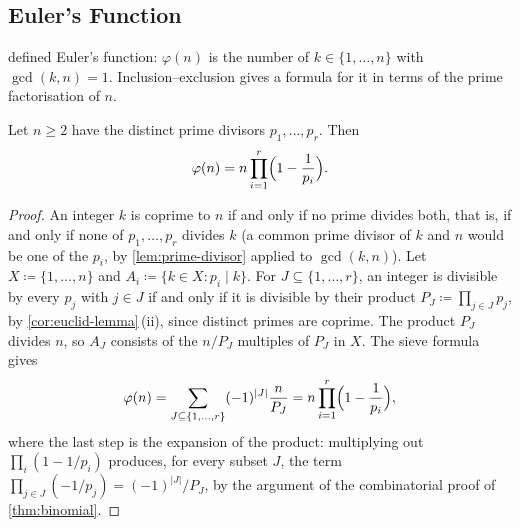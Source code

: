 \begin{table}
\end{table}

\subsection{Euler's Function}

 defined Euler's function: $\varphi(n)$ is the number of $k\in\{1,\ldots,n\}$ with $\gcd(k,n)=1$. Inclusion--exclusion gives a formula for it in terms of the prime factorisation of $n$.

\begin{theorem}
\label{thm:phi-formula}
Let $n\ge2$ have the distinct prime divisors $p_1,\ldots,p_r$. Then
\[
\varphi(n)=n\prod_{i=1}^{r}\Bigl(1-\frac1{p_i}\Bigr).
\]
\end{theorem}

\begin{proof}
An integer $k$ is coprime to $n$ if and only if no prime divides both, that is, if and only if none of $p_1,\ldots,p_r$ divides $k$ (a common prime divisor of $k$ and $n$ would be one of the $p_i$, by \cref{lem:prime-divisor} applied to $\gcd(k,n)$). Let $X\coloneqq\{1,\ldots,n\}$ and $A_i\coloneqq\{k\in X: p_i\mid k\}$. For $J\subseteq\{1,\ldots,r\}$, an integer is divisible by every $p_j$ with $j\in J$ if and only if it is divisible by their product $P_J\coloneqq\prod_{j\in J}p_j$, by \cref{cor:euclid-lemma}\,(ii), since distinct primes are coprime. The product $P_J$ divides $n$, so $A_J$ consists of the $n/P_J$ multiples of $P_J$ in $X$. The sieve formula gives
\[
\varphi(n)=\sum_{J\subseteq\{1,\ldots,r\}}(-1)^{|J|}\frac{n}{P_J}=n\prod_{i=1}^{r}\Bigl(1-\frac1{p_i}\Bigr),
\]
where the last step is the expansion of the product: multiplying out $\prod_i(1-1/p_i)$ produces, for every subset $J$, the term $\prod_{j\in J}(-1/p_j)=(-1)^{|J|}/P_J$, by the argument of the combinatorial proof of \cref{thm:binomial}.
\end{proof}

